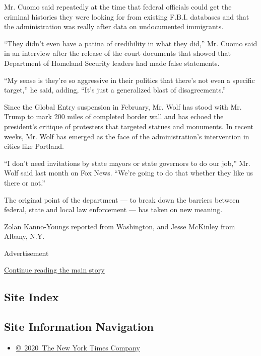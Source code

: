 Mr. Cuomo said repeatedly at the time that federal officials could get
the criminal histories they were looking for from existing F.B.I.
databases and that the administration was really after data on
undocumented immigrants.

``They didn't even have a patina of credibility in what they did,'' Mr.
Cuomo said in an interview after the release of the court documents that
showed that Department of Homeland Security leaders had made false
statements.

``My sense is they're so aggressive in their politics that there's not
even a specific target,'' he said, adding, ``It's just a generalized
blast of disagreements.''

Since the Global Entry suspension in February, Mr. Wolf has stood with
Mr. Trump to mark 200 miles of completed border wall and has echoed the
president's critique of protesters that targeted statues and monuments.
In recent weeks, Mr. Wolf has emerged as the face of the
administration's intervention in cities like Portland.

``I don't need invitations by state mayors or state governors to do our
job,'' Mr. Wolf said last month on Fox News. ``We're going to do that
whether they like us there or not.''

The original point of the department --- to break down the barriers
between federal, state and local law enforcement --- has taken on new
meaning.

Zolan Kanno-Youngs reported from Washington, and Jesse McKinley from
Albany, N.Y.

Advertisement

\protect\hyperlink{after-bottom}{Continue reading the main story}

\hypertarget{site-index}{%
\subsection{Site Index}\label{site-index}}

\hypertarget{site-information-navigation}{%
\subsection{Site Information
Navigation}\label{site-information-navigation}}

\begin{itemize}
\tightlist
\item
  \href{https://help.nytimes.com/hc/en-us/articles/115014792127-Copyright-notice}{©~2020~The
  New York Times Company}
\end{itemize}

